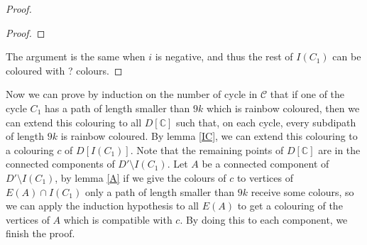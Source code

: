 \documentclass[10pt]{article}
\theoremstyle{plain}
\theoremstyle{definition}
\theoremstyle{remark}
\begin{document}
\begin{proof}
\begin{proof}
\end{proof}
%
%

The argument is the same when $i$ is negative, and thus the rest of $I(C_1)$ can be coloured with ? colours. 
\end{proof}

Now we can prove by induction on the number of cycle in $\mathcal{C}$ that if one of the cycle $C_1$ has a path of length smaller than $9k$
which is rainbow coloured, then we can extend this colouring to all $D[\mathbb{C}]$ such that, on each cycle, every subdipath of length
$9k$ is rainbow coloured. By lemma \ref{IC}, we can extend this colouring to a colouring $c$ of $D[I(C_1)]$.
 Note that the remaining points of $D[\mathbb{C}]$ are in the connected components of $D'\setminus I(C_1)$. 
Let $A$ be a connected component of $D'\setminus I(C_1)$, by lemma \ref{A} if we give the colours of $c$ to vertices of $E(A) \cap I(C_1)$
only a path of length smaller than $9k$ receive some colours, so we can apply the induction hypothesis to all $E(A)$ to get a colouring
of the vertices of $A$ which is compatible with $c$. By doing this to each component, we finish the proof.
\end{document}

